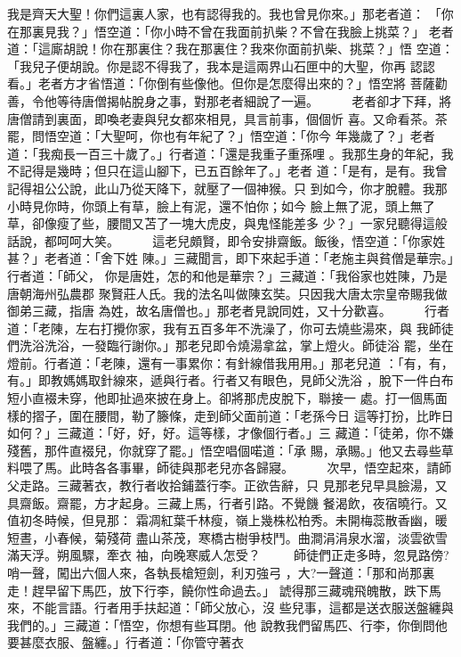 \begin{pinyinscope}
{我是齊天大聖！你們這裏人家，也有認得我的。我也曾見你來。」那老者道：
「你在那裏見我？」悟空道：「你小時不曾在我面前扒柴？不曾在我臉上挑菜？」
老者道：「這廝胡說！你在那裏住？我在那裏住？我來你面前扒柴、挑菜？」悟
空道：「我兒子便胡說。你是認不得我了，我本是這兩界山石匣中的大聖，你再
認認看。」老者方才省悟道：「你倒有些像他。但你是怎麼得出來的？」悟空將
菩薩勸善，令他等待唐僧揭帖脫身之事，對那老者細說了一遍。
　　
老者卻才下拜，將唐僧請到裏面，即喚老妻與兒女都來相見，具言前事，個個忻
喜。又命看茶。茶罷，問悟空道：「大聖呵，你也有年紀了？」悟空道：「你今
年幾歲了？」老者道：「我痴長一百三十歲了。」行者道：「還是我重子重孫哩
。我那生身的年紀，我不記得是幾時；但只在這山腳下，已五百餘年了。」老者
道：「是有，是有。我曾記得祖公公說，此山乃從天降下，就壓了一個神猴。只
到如今，你才脫體。我那小時見你時，你頭上有草，臉上有泥，還不怕你；如今
臉上無了泥，頭上無了草，卻像瘦了些，腰間又苫了一塊大虎皮，與鬼怪能差多
少？」一家兒聽得這般話說，都呵呵大笑。
　　
這老兒頗賢，即令安排齋飯。飯後，悟空道：「你家姓甚？」老者道：「舍下姓
陳。」三藏聞言，即下來起手道：「老施主與貧僧是華宗。」行者道：「師父，
你是唐姓，怎的和他是華宗？」三藏道：「我俗家也姓陳，乃是唐朝海州弘農郡
聚賢莊人氏。我的法名叫做陳玄奘。只因我大唐太宗皇帝賜我做御弟三藏，指唐
為姓，故名唐僧也。」那老者見說同姓，又十分歡喜。
　　
行者道：「老陳，左右打攪你家，我有五百多年不洗澡了，你可去燒些湯來，與
我師徒們洗浴洗浴，一發臨行謝你。」那老兒即令燒湯拿盆，掌上燈火。師徒浴
罷，坐在燈前。行者道：「老陳，還有一事累你：有針線借我用用。」那老兒道
：「有，有，有。」即教媽媽取針線來，遞與行者。行者又有眼色，見師父洗浴
，脫下一件白布短小直裰未穿，他即扯過來披在身上。卻將那虎皮脫下，聯接一
處。打一個馬面樣的摺子，圍在腰間，勒了籐條，走到師父面前道：「老孫今日
這等打扮，比昨日如何？」三藏道：「好，好，好。這等樣，才像個行者。」三
藏道：「徒弟，你不嫌殘舊，那件直裰兒，你就穿了罷。」悟空唱個喏道：「承
賜，承賜。」他又去尋些草料喂了馬。此時各各事畢，師徒與那老兒亦各歸寢。
　　
次早，悟空起來，請師父走路。三藏著衣，教行者收拾鋪蓋行李。正欲告辭，只
見那老兒早具臉湯，又具齋飯。齋罷，方才起身。三藏上馬，行者引路。不覺饑
餐渴飲，夜宿曉行。又值初冬時候，但見那：
霜凋紅葉千林瘦，嶺上幾株松柏秀。未開梅蕊散香幽，暖短晝，小春候，菊殘荷
盡山茶茂，寒橋古樹爭枝鬥。曲澗涓涓泉水溜，淡雲欲雪滿天浮。朔風驟，牽衣
袖，向晚寒威人怎受？
　　
師徒們正走多時，忽見路傍?哨一聲，闖出六個人來，各執長槍短劍，利刃強弓
，大?一聲道：「那和尚那裏走！趕早留下馬匹，放下行李，饒你性命過去。」
諕得那三藏魂飛魄散，跌下馬來，不能言語。行者用手扶起道：「師父放心，沒
些兒事，這都是送衣服送盤纏與我們的。」三藏道：「悟空，你想有些耳閉。他
說教我們留馬匹、行李，你倒問他要甚麼衣服、盤纏。」行者道：「你管守著衣
}
\end{pinyinscope}
